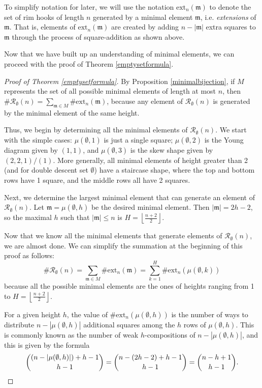 \documentclass[11pt, a4paper, reqno]{article}
\numberwithin{equation}{section}
\newcommand{\ext}{\text{ext}}
\theoremstyle{definition}
\begin{document}
	To simplify notation for later, we will use the notation $\ext_n(\mathfrak{m})$ to denote the set of rim hooks of length $n$ generated by a minimal element $\mathfrak{m}$, i.e. \textit{extensions} of $\mathfrak{m}$. That is, elements of $\ext_n(\mathfrak{m})$ are created by adding $n - |\mathfrak{m}|$ extra squares to $\mathfrak{m}$ through the process of square-addition as shown above.

	Now that we have built up an understanding of minimal elements, we can proceed with the proof of Theorem \ref{emptysetformula}.
    
    \begin{proof}[Proof of Theorem \ref{emptysetformula}]
    By Proposition \ref{minimalbijection}, if $M$ represents the set of all possible minimal elements of length at most $n$, then $\#\mathcal{R}_\emptyset(n) = \sum_{\mathfrak{m} \in M}\#\ext_n(\mathfrak{m})$, because any element of $\mathcal{R}_\emptyset(n)$ is generated by the minimal element of the same height.
    
     Thus, we begin by determining all the minimal elements of $\mathcal{R}_\emptyset(n)$. We start with the simple cases: $\mu(\emptyset,1)$ is just a single square; $\mu(\emptyset, 2)$ is the Young diagram given by $(1,1)$, and $\mu(\emptyset, 3)$ is the skew shape given by $(2,2,1)/(1)$. More generally, all minimal elements of height greater than 2 (and for double descent set $\emptyset$) have a staircase shape, where the top and bottom rows have 1 square, and the middle rows all have 2 squares.
    
     Next, we determine the largest minimal element that can generate an element of $\mathcal{R}_\emptyset(n)$. Let $\mathfrak{m} = \mu(\emptyset, h)$ be the desired minimal element. Then $|\mathfrak{m}| = 2h - 2$, so the maximal $h$ such that $|\mathfrak{m}|\leq n$ is $H = \left \lfloor \frac{n+2}{2} \right \rfloor$.
    
     Now that we know all the minimal elements that generate elements of $\mathcal{R}_\emptyset(n)$, we are almost done. We can simplify the summation at the beginning of this proof as follows: $$\#\mathcal{R}_\emptyset(n) = \sum_{\mathfrak{m} \in M}\#\ext_n(\mathfrak{m}) = \sum_{k = 1}^H\#\ext_n(\mu(\emptyset,k))$$ because all the possible minimal elements are the ones of heights ranging from 1 to $H = \left \lfloor \frac{n+2}{2} \right \rfloor$.
    
     For a given height $h$, the value of $\#\ext_n(\mu(\emptyset,h))$ is the number of ways to distribute $n - |\mu(\emptyset,h)|$ additional squares among the $h$ rows of $\mu(\emptyset,h)$. This is commonly known as the number of weak $h$-compositions of $n - |\mu(\emptyset,h)|$, and this is given by the formula $$\dbinom{(n - |\mu(\emptyset,h)|) + h - 1}{h - 1} = \dbinom{n - (2h - 2) + h - 1}{h - 1} = \dbinom{n - h + 1}{h - 1}.$$
    

\end{proof}
\end{document}
